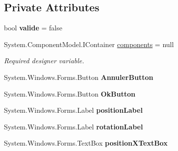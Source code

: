 \subsection*{Private Attributes}
\begin{DoxyCompactItemize}
\item 
bool {\bfseries valide} = false\hypertarget{class_interface_graphique_1_1_configuration_a0b60645d35aab2906e57b7c8cb719797}{}\label{class_interface_graphique_1_1_configuration_a0b60645d35aab2906e57b7c8cb719797}

\item 
System.\+Component\+Model.\+I\+Container \hyperlink{class_interface_graphique_1_1_configuration_a5aaae6baeb479c8a9b013cfb1ff58cda}{components} = null
\begin{DoxyCompactList}\small\item\em Required designer variable. \end{DoxyCompactList}\item 
System.\+Windows.\+Forms.\+Button {\bfseries Annuler\+Button}\hypertarget{class_interface_graphique_1_1_configuration_a10c372e2d29d52c60170cf787bd3f17d}{}\label{class_interface_graphique_1_1_configuration_a10c372e2d29d52c60170cf787bd3f17d}

\item 
System.\+Windows.\+Forms.\+Button {\bfseries Ok\+Button}\hypertarget{class_interface_graphique_1_1_configuration_a04ab1cc65f1c9f0b6ea543ca270e1996}{}\label{class_interface_graphique_1_1_configuration_a04ab1cc65f1c9f0b6ea543ca270e1996}

\item 
System.\+Windows.\+Forms.\+Label {\bfseries position\+Label}\hypertarget{class_interface_graphique_1_1_configuration_acfc803821ebc39b2158f1fbfa2bf0cc9}{}\label{class_interface_graphique_1_1_configuration_acfc803821ebc39b2158f1fbfa2bf0cc9}

\item 
System.\+Windows.\+Forms.\+Label {\bfseries rotation\+Label}\hypertarget{class_interface_graphique_1_1_configuration_ab97319dc2ddf471b1808085cc5d1ad7f}{}\label{class_interface_graphique_1_1_configuration_ab97319dc2ddf471b1808085cc5d1ad7f}

\item 
System.\+Windows.\+Forms.\+Text\+Box {\bfseries position\+X\+Text\+Box}\hypertarget{class_interface_graphique_1_1_configuration_adabeabc5ebb7a2430f99fbd325d26515}{}\label{class_interface_graphique_1_1_configuration_adabeabc5ebb7a2430f99fbd325d26515}


\end{DoxyCompactItemize}

